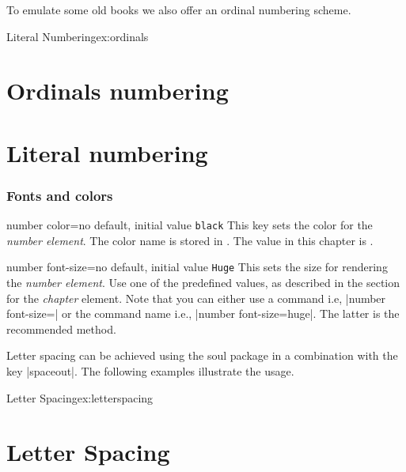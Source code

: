 To emulate some old books we also offer an ordinal numbering scheme.

\begin{texexample}{Literal Numbering}{ex:ordinals}
\chapter{Ordinals numbering}
\lorem
{}
\chapter{Literal numbering} 
\lorem
\end{texexample}


\subsection{Fonts and colors}
\begin{docKey}[phd]{number color}{=}{no default, initial value \texttt{black}}
This key sets the color for the \textit{number element}. The color name is stored in \cmd{\numbercolor@cx}.
The value in this chapter is \makeatletter\texttt{\numbercolor@cx}\makeatother.
\end{docKey}

\begin{docKey}[phd]{number font-size}{=}{no default, initial value \texttt{Huge}}
This sets the size for rendering the \textit{number element}. Use one of the predefined values, as described
in the section for the \emph{chapter} element.
Note that you can either use a command i.e, |number font-size=|\cmd{\huge} 
or the command name i.e., |number font-size=huge|. The latter is the recommended method.
\end{docKey}

Letter spacing can be achieved using the soul package in a combination with the key |spaceout|.
The following examples illustrate the usage.

\begin{texexample}{Letter Spacing}{ex:letterspacing}
\chapter{Letter Spacing}

\lorem
\end{texexample}

